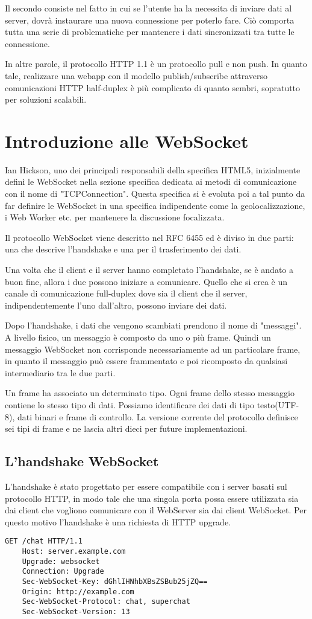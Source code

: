 Il secondo consiste nel fatto in cui se l'utente ha la necessita di inviare dati al server, 
dovrà instaurare una nuova connessione per poterlo fare.
Ciò comporta tutta una serie di problematiche per mantenere i dati
sincronizzati tra tutte le connessione.

In altre parole, il protocollo HTTP 1.1 è un protocollo pull e non push.
In quanto tale, realizzare una webapp con il modello publish/subscribe attraverso comunicazioni HTTP half-duplex è più complicato di quanto sembri, sopratutto per soluzioni scalabili.

\section{Introduzione alle WebSocket}
Ian Hickson, uno dei principali responsabili della specifica HTML5, inizialmente definì le WebSocket nella sezione specifica dedicata ai metodi di comunicazione con il nome di "TCPConnection".
Questa specifica si è evoluta poi a tal punto da far definire le WebSocket in una specifica indipendente come la geolocalizzazione, i Web Worker etc. per mantenere la discussione focalizzata.

Il protocollo WebSocket viene descritto nel RFC 6455\cite{RFC6455} ed è diviso in due parti: una che descrive l'handshake e una per il trasferimento dei dati.

Una volta che il client e il server hanno completato l'handshake, se è andato a buon fine, allora i due possono iniziare a comunicare.
Quello che si crea è un canale di comunicazione full-duplex dove sia il client che il server, indipendentemente l'uno dall'altro, possono inviare dei dati.

Dopo l'handshake, i dati che vengono scambiati prendono il nome di "messaggi". 
A livello fisico, un messaggio è composto da uno o più frame.
Quindi un messaggio WebSocket non corrisponde necessariamente ad un particolare frame, in quanto il messaggio può essere frammentato e poi ricomposto da qualsiasi intermediario tra le due parti.

Un frame ha associato un determinato tipo. 
Ogni frame dello stesso messaggio contiene lo stesso tipo di dati.
Possiamo identificare dei dati di tipo testo(UTF-8), dati binari e frame di controllo.
La versione corrente del protocollo definisce sei tipi di frame e ne lascia altri dieci per future implementazioni.
\subsection{L'handshake WebSocket}
\label{sec:handshake}
L'handshake è stato progettato per essere compatibile con i server basati sul protocollo HTTP, in modo tale che una singola porta possa essere utilizzata sia dai client che vogliono comunicare con il WebServer sia dai client WebSocket.
Per questo motivo l'handshake è una richiesta di HTTP upgrade.
\begin{lstlisting}[caption={client handshake}, style=javaScriptCode]
	GET /chat HTTP/1.1
	Host: server.example.com
	Upgrade: websocket
	Connection: Upgrade
	Sec-WebSocket-Key: dGhlIHNhbXBsZSBub25jZQ==
	Origin: http://example.com
	Sec-WebSocket-Protocol: chat, superchat
	Sec-WebSocket-Version: 13
\end{lstlisting} 

